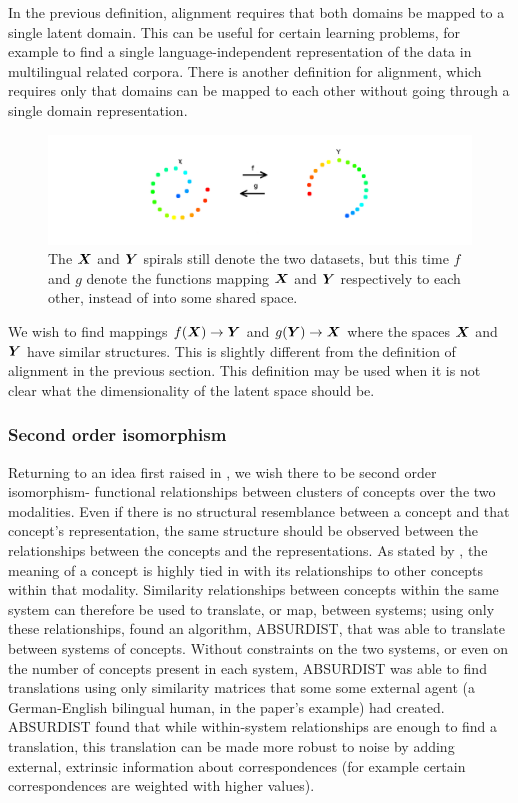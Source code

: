 In the previous definition, alignment requires that both domains be mapped to a single latent domain. This can be useful for certain learning problems, for example to find a single language-independent representation of the data in multilingual related corpora. There is another definition for alignment, which requires only that domains can be mapped to each other without going through a single domain representation. 

\begin{figure}[H]
\label{fig:alignment2}
    \centering
    \includegraphics[width=\textwidth]{images/review/alignment2.png}
    \caption{
        The $\boldsymbol{X}$ and $\boldsymbol{Y}$ spirals still denote the two datasets, but this time $f$ and $g$ denote the functions mapping $\boldsymbol{X}$ and $\boldsymbol{Y}$ respectively to each other, instead of into some shared space.
    }
\end{figure}

We wish to find mappings $f(\boldsymbol{X}) \rightarrow \boldsymbol{Y}$ and $g(\boldsymbol{Y}) \rightarrow \boldsymbol{X}$ where the spaces $\boldsymbol{X}$ and $\boldsymbol{Y}$  have similar structures. This is slightly different from the definition of alignment in the previous section. This definition may be used when it is not clear what the dimensionality of the latent space should be. 

\subsubsection{Second order isomorphism}

Returning to an idea first raised in \cite{SHEPARD19701}, we wish there to be second order isomorphism- functional relationships between clusters of concepts over the two modalities. Even if there is no structural resemblance between a concept and that concept's representation, the same structure should be observed between the relationships between the concepts  and the representations. As stated by \cite{GOLDSTONE2002295}, the meaning of a concept is highly tied in with its relationships to other concepts within that modality. Similarity relationships between concepts within the same system can therefore be used to translate, or map, between systems; using only these relationships, \cite{GOLDSTONE2002295} found an algorithm, ABSURDIST, that was able to translate between systems of concepts. Without constraints on the two systems, or even on the number of concepts present in each system, ABSURDIST was able to find translations using only similarity matrices that some some external agent (a German-English bilingual human, in the paper's example) had created. ABSURDIST found that while within-system relationships are enough to find a translation, this translation can be made more robust to noise by adding external, extrinsic information about correspondences (for example certain correspondences are weighted with higher values). 

